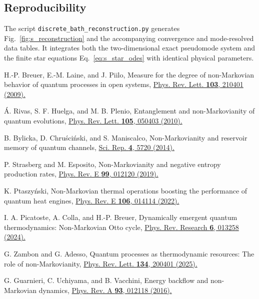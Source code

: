 \documentclass[reprint,superscriptaddress,floatfix,amsmath,amssymb,prresearch,aps]{revtex4-2}
\newcommand{\doilink}[2]{\href{https://doi.org/#1}{#2}}
\begin{document}
\subsection{Reproducibility}

The script \texttt{discrete\_bath\_reconstruction.py} generates
Fig.~\ref{fig:s_reconstruction} and the accompanying convergence and
mode-resolved data tables. It integrates both the two-dimensional exact
pseudomode system and the finite star equations
Eq.~\eqref{eq:s_star_odes} with identical physical parameters.


\begin{thebibliography}{99}

H.-P. Breuer, E.-M. Laine, and J. Piilo,
Measure for the degree of non-Markovian behavior of quantum processes in open
systems,
\doilink{10.1103/PhysRevLett.103.210401}{Phys. Rev. Lett. \textbf{103}, 210401 (2009).}

\'A. Rivas, S. F. Huelga, and M. B. Plenio,
Entanglement and non-Markovianity of quantum evolutions,
\doilink{10.1103/PhysRevLett.105.050403}{Phys. Rev. Lett. \textbf{105}, 050403 (2010).}

B. Bylicka, D. Chru\'sci\'nski, and S. Maniscalco,
Non-Markovianity and reservoir memory of quantum channels,
\doilink{10.1038/srep05720}{Sci. Rep. \textbf{4}, 5720 (2014).}

P. Strasberg and M. Esposito,
Non-Markovianity and negative entropy production rates,
\doilink{10.1103/PhysRevE.99.012120}{Phys. Rev. E \textbf{99}, 012120 (2019).}

K. Ptaszy\'nski,
Non-Markovian thermal operations boosting the performance of quantum heat
engines,
\doilink{10.1103/PhysRevE.106.014114}{Phys. Rev. E \textbf{106}, 014114 (2022).}

I. A. Picatoste, A. Colla, and H.-P. Breuer,
Dynamically emergent quantum thermodynamics: Non-Markovian Otto cycle,
\doilink{10.1103/PhysRevResearch.6.013258}{Phys. Rev. Research \textbf{6}, 013258 (2024).}

G. Zambon and G. Adesso,
Quantum processes as thermodynamic resources: The role of non-Markovianity,
\doilink{10.1103/PhysRevLett.134.200401}{Phys. Rev. Lett. \textbf{134}, 200401 (2025).}

G. Guarnieri, C. Uchiyama, and B. Vacchini,
Energy backflow and non-Markovian dynamics,
\doilink{10.1103/PhysRevA.93.012118}{Phys. Rev. A \textbf{93}, 012118 (2016).}


\end{thebibliography}
\end{document}
